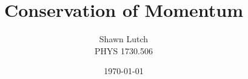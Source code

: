 \documentclass[12pt,letterpaper,titlepage]{report}
\newcommand{\myTitle}{Conservation of Momentum}
\newcommand{\myName}{Shawn Lutch}
\newcommand{\myPeriod}{PHYS 1730.506}
\begin{document}
\title{\myTitle{}}
\author{\myName{}\\ \myPeriod{}}
\date{\today}
\maketitle





\pagebreak





\pagebreak



\bigskip



\pagebreak
    




\end{document}
